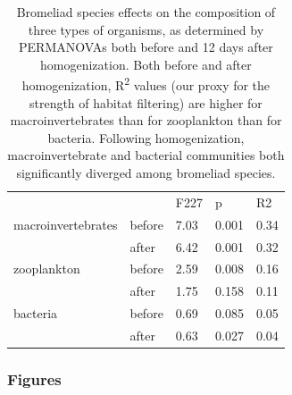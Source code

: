 \begin{center} 
\begin{table}[h] 
\caption[rtable]{Bromeliad species effects on the composition of three types of
organisms, as determined by PERMANOVAs both before and 12 days after
homogenization. Both before and after homogenization,
R\textsuperscript{2} values (our proxy for the strength of habitat
filtering) are higher for macroinvertebrates than for zooplankton than
for bacteria. Following homogenization, macroinvertebrate and bacterial
communities both significantly diverged among bromeliad species.} 
\label{table:r2s} 
\vspace{10pt} 
\begin{tabular}[c]{l l l l l} 
\hline 
& & F227 & p & R2 \\
macroinvertebrates & before & 7.03 & 0.001 & 0.34 \\
& after & 6.42 & 0.001 & 0.32 \\
zooplankton & before & 2.59 & 0.008 & 0.16 \\
& after & 1.75 & 0.158 & 0.11 \\
bacteria & before & 0.69 & 0.085 & 0.05 \\
& after & 0.63 & 0.027 & 0.04 \\
\end{tabular} 
\end{table} 
\end{center} 


\subsubsection{Figures}\label{figures}

